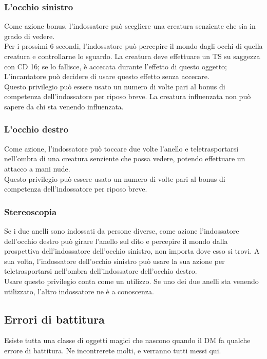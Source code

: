 \subsubsection{L'occhio sinistro}
Come azione bonus, l'indossatore può scegliere una creatura senziente che sia in grado di vedere. \\ Per i prossimi 6 secondi, l'indossatore può percepire il mondo dagli occhi di quella creatura e controllarne lo sguardo. La creatura deve effettuare un TS su saggezza con CD 16; se lo fallisce, è accecata durante l'effetto di questo oggetto; L'incantatore può decidere di usare questo effetto senza accecare. \\ Questo privilegio può essere usato un numero di volte pari al bonus di competenza dell'indossatore per riposo breve. La creatura influenzata non può sapere da chi sta venendo influenzata.

\subsubsection{L'occhio destro}
Come azione, l'indossatore può toccare due volte l'anello e teletrasportarsi nell'ombra di una creatura senziente che possa vedere, potendo effettuare un attacco a mani nude. \\ Questo privilegio può essere usato un numero di volte pari al bonus di competenza dell'indossatore per riposo breve.

\subsubsection{Stereoscopia}
Se i due anelli sono indossati da persone diverse, come azione l'indossatore dell'occhio destro può girare l'anello sul dito e percepire il mondo dalla prospettiva dell'indossatore dell'occhio sinistro, non importa dove esso si trovi. A sua volta, l'indossatore dell'occhio sinistro può usare la sua azione per teletrasportarsi nell'ombra dell'indossatore dell'occhio destro. \\ Usare questo privilegio conta come un utilizzo. Se uno dei due anelli sta venendo utilizzato, l'altro indossatore ne è a conoscenza.

\subsection{Errori di battitura}
Esiste tutta una classe di oggetti magici che nascono quando il DM fa qualche errore di battitura. Ne incontrerete molti, e verranno tutti messi qui.

